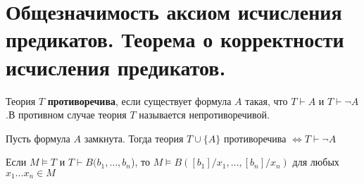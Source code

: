 \section{Общезначимость аксиом исчисления предикатов. Теорема о корректности исчисления предикатов.}
\begin{definition}
	Теория $T$ \textbf{противоречива}, если существует формула $A$
	такая, что $T\vdash A$ и  $T\vdash \neg A$.В противном случае теория $T$ называется непротиворечивой.
\end{definition}
\begin{corollary} Пусть формула $A$ замкнута. Тогда теория
	$T \cup \{A\}$ противоречива $\Longleftrightarrow T \vdash \neg A$
\end{corollary}
\begin{theorem}
	Если $M\vDash T$ и $T \vdash B(b_1,\dots,b_n$), то $M \vDash B([b_1]/x_1,\dots,[b_n]/x_n)$ для любых
	$x_1\dots x_n \in M$
\end{theorem}
